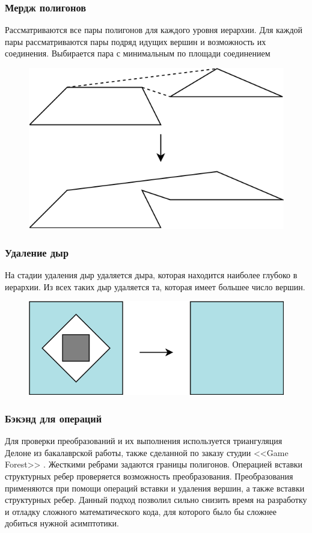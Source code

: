 \documentclass{fefu_thesis/cls/fefu}
\begin{document}
    \subsubsection{Мердж полигонов}
    Рассматриваются все пары полигонов для каждого уровня иерархии. Для каждой пары рассматриваются пары подряд идущих вершин и возможность их соединения. Выбирается пара с минимальным по площади соединением
    \begin{figure}[H]
        \centering
        \includegraphics[width=0.8\linewidth, keepaspectratio]{images/merge.png}
    \end{figure}
    \subsubsection{Удаление дыр}
    На стадии удаления дыр удаляется дыра, которая находится наиболее глубоко в иерархии. Из всех таких дыр удаляется та, которая имеет большее число вершин.
    \begin{figure}[H]
        \centering
        \includegraphics[width=0.8\linewidth, keepaspectratio]{images/remove_hole.png}
    \end{figure}
    \subsubsection{Бэкэнд для операций}
    Для проверки преобразований и их выполнения используется триангуляция Делоне\cite{Delaunay} из бакалаврской работы, также сделанной по заказу студии <<Game Forest>> . Жесткими ребрами задаются границы полигонов. Операцией вставки структурных ребер проверяется возможность преобразования. Преобразования применяются при помощи операций вставки и удаления вершин, а также вставки структурных ребер. Данный подход позволил сильно снизить время на разработку и отладку сложного математического кода, для которого было бы сложнее добиться нужной асимптотики.
\end{document}
